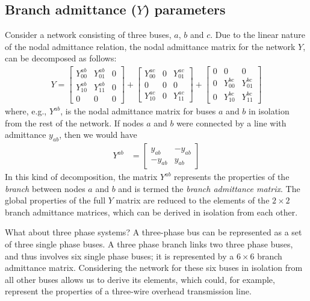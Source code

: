 \documentclass[11pt]{article}
\begin{document}
\subsection{Branch admittance ($Y$) parameters}
Consider a network consisting of three buses, $a$, $b$ and $c$. Due to the linear nature of the nodal admittance relation, the nodal admittance matrix for the network $Y$, can be decomposed as follows:
\begin{align}
	Y = \begin{bmatrix}
		Y^{ab}_{00} & Y^{ab}_{01} & 0 \\ Y^{ab}_{10} & Y^{ab}_{11} & 0 \\ 0 & 0 & 0
	\end{bmatrix} + \begin{bmatrix}
		Y^{ac}_{00} & 0 & Y^{ac}_{01} \\ 0 & 0 & 0 \\ Y^{ac}_{10} & 0 &  Y^{ac}_{11}
	\end{bmatrix} + \begin{bmatrix}
		0 & 0 & 0 \\ 0 & Y^{bc}_{00} & Y^{bc}_{01} \\ 0 & Y^{bc}_{10} &  Y^{bc}_{11}
	\end{bmatrix}
	\label{EQ_BRANCH_DECOMP}
\end{align}
where, e.g., $Y^{ab}$, is the nodal admittance matrix for buses $a$ and $b$ in isolation from the rest of the network. If nodes $a$ and $b$ were connected by a line with admittance $y_{ab}$, then we would have
\begin{align}
	Y^{ab} &= 
	\begin{bmatrix}
		y_{ab} & -y_{ab} \\
		-y_{ab} & y_{ab}
	\end{bmatrix}
\end{align}
In this kind of decomposition, the matrix $Y^{ab}$ represents the properties of the \emph{branch} between nodes $a$ and $b$ and is termed the \emph{branch admittance matrix}. The global properties of the full $Y$ matrix are reduced to the elements of the $2 \times 2$ branch admittance matrices, which can be derived in isolation from each other.

What about three phase systems? A three-phase bus can be represented as a set of three single phase buses. A three phase branch links two three phase buses, and thus involves six single phase buses; it is represented by a $6 \times 6$ branch admittance matrix. Considering the network for these six buses in isolation from all other buses allows us to derive its elements, which could, for example, represent the properties of a three-wire overhead transmission line.
\end{document}

